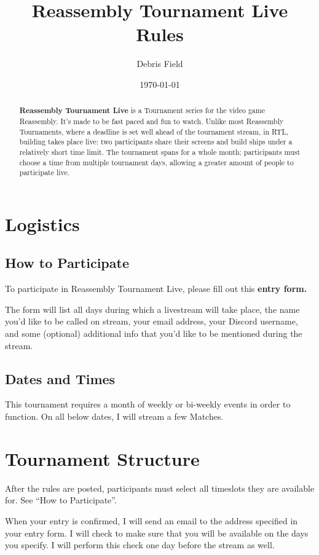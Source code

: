 \documentclass[11pt]{article}
\newcommand{\RTL}{Reassembly Tournament Live}
\begin{document}
\title{Reassembly Tournament Live Rules}
\author{Debris Field}
\date{\today}
\maketitle

\begin{abstract}
\textbf{\RTL{}} is a Tournament
series for the video game Reassembly. It's made to be fast paced and fun to watch. Unlike most Reassembly Tournaments, where
a deadline is set well ahead of the tournament stream, in RTL,
building takes place live: two participants share their screens and
build ships under a relatively short time limit. The tournament spans
for a whole month; participants must choose a time from multiple
tournament days, allowing a greater amount of people to participate live.

\end{abstract}

\tableofcontents

\section{Logistics}
\subsection{How to Participate}
To participate in \RTL{}, please fill out this \textbf{entry form.}

The form will list all days during which a livestream will take place, the name you'd like to
be called on stream, your email address, your Discord username, and 
some (optional) additional info that you'd like to be mentioned during the stream.

\subsection{Dates and Times}
This tournament requires a month of weekly or bi-weekly events in order to function. On all
below dates, I will stream a few Matches.

\section{Tournament Structure}
After the rules are posted, participants must select all timeslots they are available for.
See ``How to Participate''.

When your entry is confirmed, I will send an email to the address specified in your entry form.
I will check to make sure that you will be available on the days you specify.
I will perform this check one day before the stream as well.\\
\end{document}
